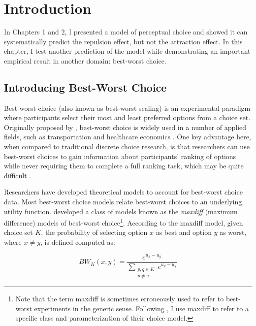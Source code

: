 \section{Introduction}

In Chapters 1 and 2, I presented a model of perceptual choice and showed it can systematically predict the repulsion effect, but not the attraction effect. In this chapter, I test another prediction of the model while demonstrating an important empirical result in another domain: best-worst choice.

\subsection{Introducing Best-Worst Choice}

Best-worst choice (also known as best-worst scaling) is an experimental paradigm where participants select their most and least preferred options from a choice set. Originally proposed by \textcite{finn1992determining}, best-worst choice is widely used in a number of applied fields, such as transportation \parencite{beck2016best} and healthcare economics \parencite{cheung2016using,flynn2007best}. One key advantage here, when compared to traditional discrete choice research, is that researchers can use best-worst choices to gain information about participants' ranking of options while never requiring them to complete a full ranking task, which may be quite difficult \parencite{marleyProbabilisticModelsBest2005}.

Researchers have developed theoretical models to account for best-worst choice data. Most best-worst choice models relate best-worst choices to an underlying utility function. \textcite{marleyProbabilisticModelsBest2005} developed a class of models known as the \textit{maxdiff} (maximum difference) models of best-worst choice\footnote{Note that the term maxdiff is sometimes erroneously used to refer to best-worst experiments in the generic sense. Following \textcite{marleyProbabilisticModelsBest2005}, I use maxdiff to refer to a specific class and parameterization of their choice model.}. According to the maxdiff model, given choice set $K$, the probability of selecting option $x$ as best and option $y$ as worst, where $x \neq y$, is defined computed as:

\begin{equation}
   BW_{K}(x,y)=\frac{e^{u_{x}-u_{y}}}{\sum_{\substack{{p,q}\in K\\p \neq q}} e^{u_{p}-u_{q}}}   
   \label{eqn:maxdiff_equation}
\end{equation}

